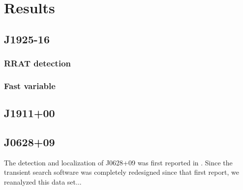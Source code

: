 \section{Results}

\subsection{J1925-16}
\subsubsection{RRAT detection}


\subsubsection{Fast variable}


\subsection{J1911+00}

\subsection{J0628+09}

The detection and localization of J0628+09 was first reported in \cite{Law_2012}. Since the transient search software was completely redesigned since that first report, we reanalyzed this data set...
  
  